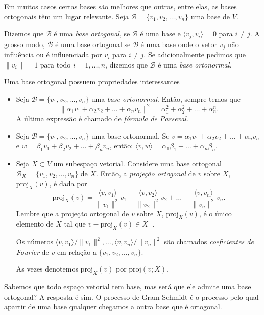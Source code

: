 \documentclass[10pt]{article}
\theoremstyle{plain}
\theoremstyle{obs}
\numberwithin{equation}{section}
\begin{document}
Em muitos casos certas bases são melhores que outras, entre elas, as bases ortogonais
têm um lugar relevante.
Seja $\mathcal{B}=\{v_1, v_2, \dots, v_n\}$ uma base de $V$. 

Dizemos que $\mathcal{B}$ é uma {\it base ortogonal}, se 
$\mathcal{B}$ é uma base e $\langle v_{j},v_{i} \rangle=0$ 
para $i\neq j$. A grosso modo, $\mathcal{B}$ é uma base ortogonal se $\mathcal{B}$
é uma base onde o vetor 
$v_{j}$ não influência ou é influenciada 
por $v_{i}$ para $i\neq j$.
Se adicionalmente pedimos que $\|v_{i}\|=1$ para todo $i=1,\dots,n$, dizemos que 
$\mathcal{B}$ é uma {\it base ortonormal}.

Uma base ortogonal possuem propriedades interessantes
  \begin{itemize}
   \item Seja $\mathcal{B}=\{v_1, v_2, \dots, v_n\}$ uma {\it base ortonormal}. Então, 
   sempre temos que 
   $$ \|\alpha_1v_1+\alpha_2v_2+\dots+\alpha_nv_n\|^{2}=\alpha_{1}^{2}+\alpha_{2}^{2}+\dots+\alpha_{n}^{n}.$$
   A última expressão é chamado de {\it fórmula de Parseval}.
   \item Seja $\mathcal{B}=\{v_1, v_2, \dots, v_n\}$ uma base ortonormal. 
   Se  $v=\alpha_1v_1+\alpha_2v_2+\dots+\alpha_nv_n$
   e  $w=\beta_1v_1+\beta_2v_2+\dots+\beta_nv_n$, então:
   $\langle v,w \rangle= \alpha_1\beta_1+\dots+\alpha_n\beta_n$.
   \item Seja $X \subset V$ um subespaço vetorial. Considere uma base ortogonal
   $\mathcal{B}_{X}=\{v_1, v_2, \dots, v_n\}$ de $X$. Então, a {\it projeção ortogonal} 
   de $v$ sobre $X$, $\text{proj}_{X}(v)$,  é dada por
   $$ \text{proj}_{X}(v)= \frac{\langle v, v_1 \rangle}{\|v_1\|^2} v_{1}+
                          \frac{\langle v, v_2 \rangle}{\|v_2\|^2} v_{2}+
                          \dots+
                          \frac{\langle v, v_n \rangle}{\|v_n\|^2} v_{n}. $$  
   Lembre que a projeção ortogonal de $v$ sobre $X$, $\text{proj}_{X}(v)$, é o único elemento de 
   $X$ tal que $v-\text{proj}_{X}(v) \in X^{\perp}$.
   
   Os números $\langle v, v_1 \rangle/\|v_1\|^2, \dots, \langle v, v_n \rangle/\|v_n\|^2$
   são chamados {\it coeficientes de Fourier} de $v$ em relação a $\{v_1, v_2, \dots, v_n\}$. 
   
   As vezes denotemos $\text{proj}_{X}(v)$ por $\text{proj}(v;X)$.
  \end{itemize}

Sabemos que todo espaço vetorial tem base, mas será que ele admite uma base ortogonal? 
A resposta é sim. O processo de Gram-Schmidt é o processo pelo qual apartir 
de uma base qualquer chegamos a outra base que é ortogonal.
 
\end{document}

